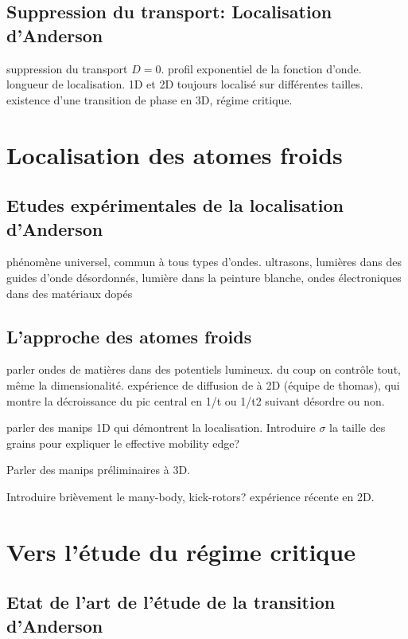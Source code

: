 \subsection{Suppression du transport: Localisation d'Anderson}
\label{sc:localisation_anderson}
suppression du transport $D=0$. profil exponentiel de la fonction d'onde. longueur de localisation.
1D et 2D toujours localisé sur différentes tailles. existence d'une transition de phase en 3D, régime critique.

\section{Localisation des atomes froids}
\subsection{Etudes expérimentales de la localisation d'Anderson}
phénomène universel, commun à tous types d'ondes.
ultrasons, lumières dans des guides d'onde désordonnés, lumière dans la peinture blanche, ondes électroniques dans des matériaux dopés


\subsection{L'approche des atomes froids}
parler ondes de matières dans des potentiels lumineux. du coup on contrôle tout, même la dimensionalité. 
expérience de diffusion de à 2D (équipe de thomas), qui montre la décroissance du  pic central en 1/t ou 1/t2 suivant désordre ou non.

parler des manips 1D qui démontrent la localisation. Introduire $\sigma$ la taille des grains pour expliquer le effective mobility edge?

Parler des manips préliminaires à 3D. 

Introduire brièvement le many-body, kick-rotors?
expérience récente en 2D.

\section{Vers l'étude du régime critique}
\subsection{Etat de l'art de l'étude de la transition d'Anderson}
\lipsum[6]
